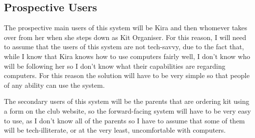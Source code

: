 \documentclass[
11pt, %
a4paper, %
oneside, %
headinclude,footinclude, %
BCOR5mm, %
]{scrartcl}
\begin{document}
\subsection{Prospective Users}
The prospective main users of this system will be Kira and then whomever takes over from her when she steps down as Kit Organiser. For this reason, I will need to assume that the users of this system are not tech-savvy, due to the fact that, while I know that Kira knows how to use computers fairly well, I don't know who will be following her so I don't know what their capabilities are regarding computers. For this reason the solution will have to be very simple so that people of any ability can use the system. \par 
The secondary users of this system will be the parents that are ordering kit using a form on the club website, so the forward-facing system will have to be very easy to use, as I don't know all of the parents so I have to assume that some of them will be tech-illiterate, or at the very least, uncomfortable with computers. 
\end{document}
